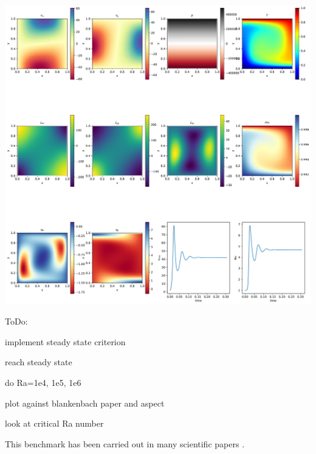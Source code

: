 \includegraphics[width=16cm]{python_codes/fieldstone_03/solution_convection_box.pdf}

ToDo:

implement steady state criterion

reach steady state

do Ra=1e4, 1e5, 1e6

plot against blankenbach paper and aspect

look at critical Ra number

This benchmark has been carried out in many scientific papers \cite{bepo10}.
